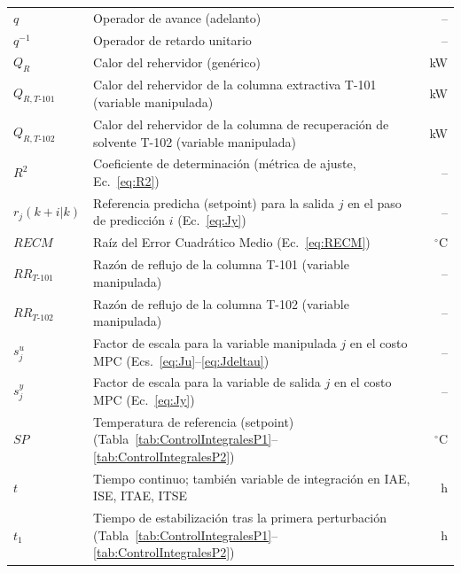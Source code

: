 \begin{longtable}{@{} l p{} r @{}}
$q$
  & Operador de avance (adelanto)
  & -- \\

$q^{-1}$
  & Operador de retardo unitario
  & -- \\

$Q_{R}$
  & Calor del rehervidor (genérico)
  & kW \\

$Q_{R,T\text{-}101}$
  & Calor del rehervidor de la columna extractiva T-101 (variable manipulada)
  & kW \\

$Q_{R,T\text{-}102}$
  & Calor del rehervidor de la columna de recuperación de solvente T-102 (variable manipulada)
  & kW \\

$R^2$
  & Coeficiente de determinación (métrica de ajuste, Ec.~\ref{eq:R2})
  & -- \\

$r_j(k{+}i|k)$
  & Referencia predicha (setpoint) para la salida $j$ en el paso de predicción $i$ (Ec.~\ref{eq:Jy})
  & -- \\

$RECM$
  & Raíz del Error Cuadrático Medio (Ec.~\ref{eq:RECM})
  & $^{\circ}$C \\

$RR_{T\text{-}101}$
  & Razón de reflujo de la columna T-101 (variable manipulada)
  & -- \\

$RR_{T\text{-}102}$
  & Razón de reflujo de la columna T-102 (variable manipulada)
  & -- \\

$s_j^u$
  & Factor de escala para la variable manipulada $j$ en el costo MPC (Ecs.~\ref{eq:Ju}--\ref{eq:Jdeltau})
  & -- \\

$s_j^y$
  & Factor de escala para la variable de salida $j$ en el costo MPC (Ec.~\ref{eq:Jy})
  & -- \\

$SP$
  & Temperatura de referencia (setpoint) (Tabla~\ref{tab:ControlIntegralesP1}--\ref{tab:ControlIntegralesP2})
  & $^{\circ}$C \\

$t$
  & Tiempo continuo; también variable de integración en IAE, ISE, ITAE, ITSE
  & h \\

$t_1$
  & Tiempo de estabilización tras la primera perturbación (Tabla~\ref{tab:ControlIntegralesP1}--\ref{tab:ControlIntegralesP2})
  & h \\


\end{longtable}
